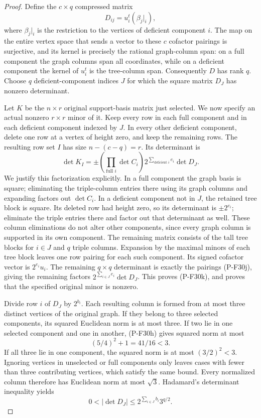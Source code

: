 \documentclass[11pt,a4paper]{article}
\begin{document}
\begin{proof}
Define the $c\times q$ compressed matrix
\[
 D_{ij}=u_i^t(\beta_j|_i),
 \tag{P-F30j}
\]
where $\beta_j|_i$ is the restriction to the vertices
of deficient component $i$. The map on the entire
vertex space that sends a vector to these $c$
cofactor pairings is surjective, and its kernel
is precisely the rational graph-column span:
on a full component the graph columns span all
coordinates, while on a deficient component the
kernel of $u_i^t$ is the tree-column span.
Consequently $D$ has rank $q$. Choose $q$
deficient-component indices $J$ for which the
square matrix $D_J$ has nonzero determinant.

Let $K$ be the $n\times r$ original support-basis
matrix just selected. We now specify an actual
nonzero $r\times r$ minor of it. Keep every row
in each full component and in each deficient
component indexed by $J$. In every other deficient
component, delete one row at a vertex of height zero,
and keep the remaining rows. The resulting row
set $I$ has size $n-(c-q)=r$. Its determinant is
\[
 \det K_I
   =\pm\left(\prod_{\text{full }i}\det C_i\right)
          2^{\sum_{\text{deficient }i}e_i}
          \det D_J.
 \tag{P-F30k}
\]
We justify this factorization explicitly.
In a full component the graph basis is square;
eliminating the triple-column entries there
using its graph columns and expanding factors
out $\det C_i$. In a deficient component not
in $J$, the retained tree block is square.
Its deleted row had height zero, so its determinant
is $\pm2^{e_i}$; eliminate the triple entries
there and factor out that determinant as well.
These column eliminations do not alter other
components, since every graph column is supported
in its own component.
The remaining matrix consists of the tall
tree blocks for $i\in J$ and $q$ triple columns.
Expansion by the maximal minors of each tree
block leaves one row pairing for each such
component. Its signed cofactor vector is
$2^{e_i}u_i$. The remaining $q\times q$
determinant is exactly the pairings (P-F30j),
giving the remaining factors
$2^{\sum_{i\in J}e_i}\det D_J$.
This proves (P-F30k), and proves that the
specified original minor is nonzero.

Divide row $i$ of $D_J$ by $2^{b_i}$.
Each resulting column is formed from at most
three distinct vertices of the original graph.
If they belong to three selected components,
its squared Euclidean norm is at most three.
If two lie in one selected component and one
in another, (P-F30h) gives squared norm at most
\[
 (5/4)^2+1=41/16<3.
\]
If all three lie in one component, the squared
norm is at most $(3/2)^2<3$. Ignoring vertices
in unselected or full components only leaves
cases with fewer than three contributing vertices,
which satisfy the same bound. Every normalized
column therefore has Euclidean norm at most
$\sqrt3$. Hadamard's determinant inequality yields
\[
 0<|\det D_J|
       \le 2^{\sum_{i\in J}b_i}3^{q/2}.
 \tag{P-F30l}
\]


\end{proof}
\end{document}
